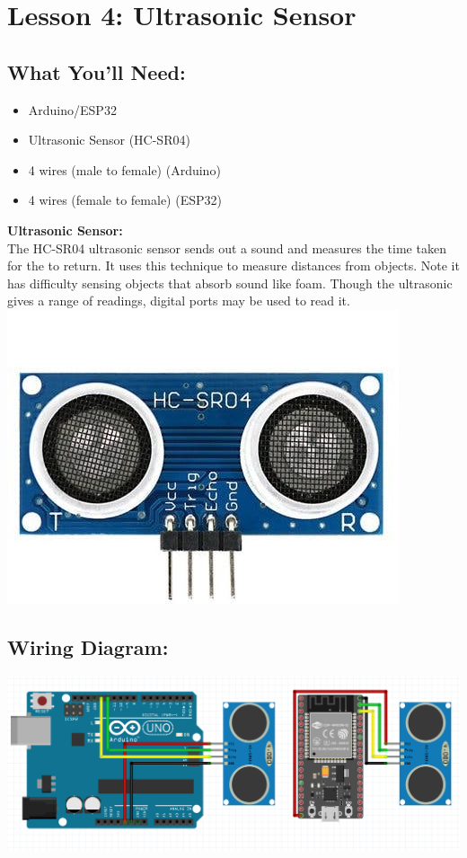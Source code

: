 \documentclass[a4paper,12pt]{report}
\newcommand{\diagramWidth}{150mm}
\begin{document}
\newpage

\section*{Lesson 4: Ultrasonic Sensor}
    \subsection*{What You'll Need:}
        \begin{itemize}
            \item Arduino/ESP32
            \item Ultrasonic Sensor (HC-SR04)
            \item 4 wires (male to female) (Arduino)
            \item 4 wires (female to female) (ESP32)
        \end{itemize}
        \begin{mdframed}[linewidth = 3, linecolor = turbo_purple]
            \textbf{Ultrasonic Sensor:} \\
            The HC-SR04 ultrasonic sensor sends out a sound and measures the time taken for the to return. It uses this technique to measure distances from objects. Note it has difficulty sensing objects that absorb sound like foam. Though the ultrasonic gives a range of readings, digital ports may be used to read it. \\
            \includegraphics[scale = 0.3]{Assets/Ultrasonic.jpg}
        \end{mdframed}
    \subsection*{Wiring Diagram:}
        \includegraphics[width = \diagramWidth]{Assets/arduino_esp_ultrasonic.png}
\end{document}
